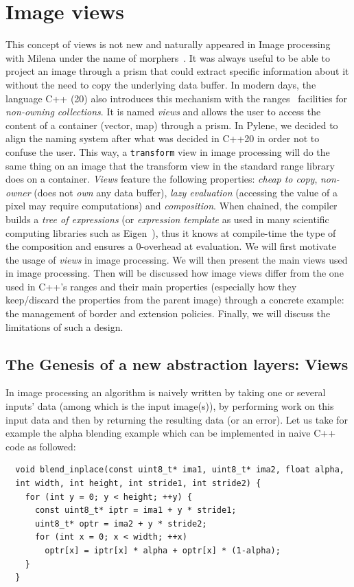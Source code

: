 \chapter{Image views}
\label{chap:image_views}

This concept of views is not new and naturally appeared in Image processing with Milena under the name of
morphers~\parencite{levillain.2009.ismm, geraud.2012.hdr}. It was always useful to be able to project an image through a
prism that could extract specific information about it without the need to copy the underlying data buffer. In modern
days, the language C++ (20) also introduces this mechanism with the ranges~\parencite{niebler.2014.ranges} facilities
for \emph{non-owning collections}. It is named \emph{views} and allows the user to access the content of a container
(vector, map) through a prism. In Pylene, we decided to align the naming system after what was decided in C++20 in order
not to confuse the user. This way, a \texttt{transform} view in image processing will do the same thing on an image that
the transform view in the standard range library does on a container. \emph{Views} feature the following properties:
\emph{cheap to copy}, \emph{non-owner} (does not \emph{own} any data buffer), \emph{lazy evaluation} (accessing the
value of a pixel may require computations) and \emph{composition}. When chained, the compiler builds a \emph{tree of
  expressions} (or \emph{expression template} as used in many scientific computing libraries such as
Eigen~\parencite{guennebaud.2010.eigen}), thus it knows at compile-time the type of the composition and ensures a
0-overhead at evaluation. We will first motivate the usage of \emph{views} in image processing. We will then present the
main views used in image processing. Then will be discussed how image views differ from the one used in C++'s ranges and
their main properties (especially how they keep/discard the properties from the parent image) through a concrete
example: the management of border and extension policies. Finally, we will discuss the limitations of such a design.

\section{The Genesis of a new abstraction layers: Views}
\label{sec:genesis_of_views}

In image processing an algorithm is naively written by taking one or several inputs' data (among which is the input
image(s)),  by performing work on this input data and then by returning the resulting data (or an error). Let us take
for example the alpha blending example which can be implemented in naive C++ code as followed:
\begin{verbatim}
  void blend_inplace(const uint8_t* ima1, uint8_t* ima2, float alpha,
  int width, int height, int stride1, int stride2) {
    for (int y = 0; y < height; ++y) {
      const uint8_t* iptr = ima1 + y * stride1;
      uint8_t* optr = ima2 + y * stride2;
      for (int x = 0; x < width; ++x)
        optr[x] = iptr[x] * alpha + optr[x] * (1-alpha);
    }
  }
\end{verbatim}

